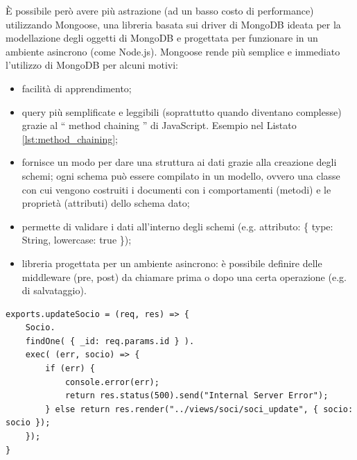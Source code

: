 \documentclass[12pt]{report}
\begin{document}
È possibile però avere più astrazione (ad un basso costo di performance) utilizzando Mongoose, una libreria basata sui driver di MongoDB ideata per la modellazione degli oggetti di MongoDB e progettata per funzionare in un ambiente asincrono (come Node.js). Mongoose rende più semplice e immediato l'utilizzo di MongoDB per alcuni motivi:
\begin{itemize}
	\item facilità di apprendimento;
	\item query più semplificate e leggibili (soprattutto quando diventano complesse) grazie al \textquotedblleft{} method chaining \textquotedblright{} di JavaScript. Esempio nel Listato \ref{lst:method_chaining};
	\item fornisce un modo per dare una struttura ai dati grazie alla creazione degli schemi; ogni schema può essere compilato in un modello, ovvero una classe con cui vengono costruiti i documenti con i comportamenti (metodi) e le proprietà (attributi) dello schema dato;
	\item permette di validare i dati all'interno degli schemi (e.g. attributo: \{ type: String, lowercase: true \});
	\item libreria progettata per un ambiente asincrono: è possibile definire delle middleware (pre, post) da chiamare prima o dopo una certa operazione (e.g. di salvataggio). 
\end{itemize}
\begin{lstlisting}[caption={Esempio di query con \emph{mongoose}. Questa funzione cerca nel database dei soci per l'identificatore passato tra i parametri e poi carica la pagina per aggiornare il socio trovato}, label={lst:method_chaining}]
exports.updateSocio = (req, res) => {
	Socio.
	findOne( { _id: req.params.id } ).
	exec( (err, socio) => {
		if (err) {
			console.error(err);
			return res.status(500).send("Internal Server Error");
		} else return res.render("../views/soci/soci_update", { socio: socio });
	});
}
\end{lstlisting}
\end{document}
